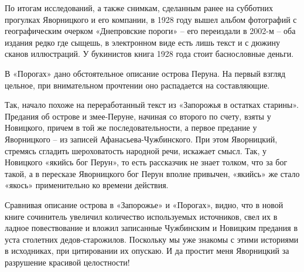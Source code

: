 По итогам исследований, а также снимкам, сделанным ранее на субботних прогулках Яворницкого и его компании, в 1928 году вышел альбом фотографий с географическим очерком «Днепровские пороги» – его переиздали в 2002-м – оба издания редко где сыщешь, в электронном виде есть лишь текст и с дюжину сканов иллюстраций. У букинистов книга 1928 года стоит баснословные деньги.

В «Порогах» дано обстоятельное описание острова Перуна. На первый взгляд цельное, при внимательном прочтении оно распадается на составляющие. 

Так, начало похоже на переработанный текст из «Запорожья в остатках старины». Предания об острове и змее-Перуне, начиная со второго по счету, взяты у Новицкого, причем в той же последовательности, а первое предание у Яворницкого – из записей Афанасьева-Чужбинского. При этом Яворницкий, стремясь сгладить шероховатость народной речи, искажает смысл. Так, у Новицкого «якийсь бог Перун», то есть рассказчик не знает толком, что за бог такой, а в пересказе Яворницкого бог Перун вполне привычен, «якийсь» же стало «якось» применительно ко времени действия.

Сравнивая описание острова в «Запорожье» и «Порогах», видно, что в новой книге сочинитель увеличил количество используемых источников, свел их в ладное повествование и вложил записанные Чужбинским и Новицким предания в уста столетних дедов-старожилов. Поскольку мы уже знакомы с этими историями в исходниках, при цитировании их опускаю. И да простит меня Яворницкий за разрушение красивой целостности!

